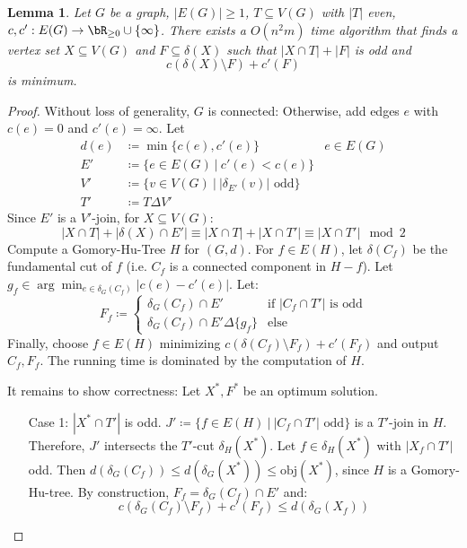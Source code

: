 \documentclass[11pt, a4paper]{article}
\newcommand{\abs}[1]{\left\lvert#1\right\rvert}
\newcommand{\set}[1]{\{#1\}}
\newtheorem{lemma}[theorem]{Lemma}
\theoremstyle{remark}
\theoremstyle{definition}
\begin{document}
\begin{lemma}\label{lemma:padberg-rao}
	Let $G$ be a graph, $\abs{E(G)}\geq1$, $T\subseteq V(G)$ with $\abs{T}$
	even, $c,c': E(G) \to \bR_{\geq0}\cup\set{\infty}$. There exists a
	$O(n^2m)$ time algorithm that finds a vertex set $X\subseteq V(G)$ and
	$F\subseteq \delta(X)$ such that $\abs{X\cap T}+\abs{F}$ is odd and
	\[c(\delta(X)\setminus F)+c'(F)\]
	is minimum.
\end{lemma}
\begin{proof}
	Without loss of generality, $G$ is connected: Otherwise, add edges $e$
	with $c(e)=0$ and $c'(e)=\infty$. Let
	\begin{align*}
		d(e) & \coloneqq\min\set{c(e),c'(e)}                                 & e\in E(G) \\
		E'   & \coloneqq \set{e\in E(G)\ |\ c'(e)<c(e)}                                  \\
		V'   & \coloneqq \set{v\in V(G)\ |\ \abs{\delta_{E'}(v)}\text{ odd}}             \\
		T'   & \coloneqq T\Delta V'
	\end{align*}
	Since $E'$ is a $V'$-join, for $X\subseteq V(G)$:
	\[\abs{X\cap T}+\abs{\delta(X)\cap E'}\equiv \abs{X\cap T}+\abs{X\cap T'}
		\equiv \abs{X\cap T'} \mod 2\]
	Compute a Gomory-Hu-Tree $H$ for $(G,d)$. For $f\in E(H)$, let
	$\delta(C_f)$ be the fundamental cut of $f$ (i.e. $C_f$ is a
	connected component in $H-f$). Let
	$g_f\in\arg\min_{e\in\delta_G(C_f)}\abs{c(e)-c'(e)}$. Let:
	\[F_f\coloneqq\begin{cases}
			\delta_G(C_f)\cap E'                & \text{if $\abs{C_f\cap T'}$ is odd} \\
			\delta_G(C_f)\cap E'\Delta\set{g_f} & \text{else}
		\end{cases}\]
	Finally, choose $f\in E(H)$ minimizing $c(\delta(C_f)\setminus
		F_f)+c'(F_f)$ and output $C_f,F_f$. The running time is dominated by
	the computation of $H$.

	It remains to show correctness: Let $X^*,F^*$ be an optimum solution.
	\begin{enumerate}
		\item[Case 1:] $\abs{X^*\cap T'}$ is odd. $J'\coloneqq\set{f\in E(H)\ |\
				\abs{C_f \cap T'}\text{ odd}}$ is a $T'$-join in $H$. Therefore, $J'$
		intersects the $T'$-cut $\delta_H(X^*)$. Let $f\in\delta_H(X^*)$ with
		$\abs{X_f \cap T'}$ odd. Then $d(\delta_G(C_f))\leq
			d(\delta_G(X^*))\leq\mathrm{obj}(X^*)$, since $H$ is a
		Gomory-Hu-tree. By construction, $F_f=\delta_G(C_f)\cap E'$ and:
		\[c(\delta_G(C_f)\setminus F_f)+c'(F_f)\leq d(\delta_G(X_f))\]


\end{enumerate}
\end{proof}
\end{document}
